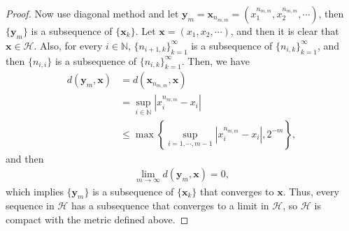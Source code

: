 \documentclass[11pt]{article}
\theoremstyle{definition}
\numberwithin{equation}{subsection}
\begin{document}
\begin{proof}
Now use diagonal method and let $\mathbf{y}_m = \mathbf{x}_{n_{m,m}} = \left(x^{n_{m,m}}_1, x^{n_{m,m}}_2, \cdots \right)$, then $\{\mathbf{y}_m\}$ is a subsequence of $\{\mathbf{x}_k\}$. Let $\mathbf{x} = (x_1, x_2,  \cdots)$, and then it is clear that $\mathbf{x} \in \mathcal{H}$. Also, for every $i \in \mathbb{N}$, $\{n_{i+1,k}\}^{\infty}_{k=1}$ is a subsequence of $\{n_{i,k}\}^{\infty}_{k=1}$, and then $\{n_{i,i}\}$ is a subsequence of $\{n_{i,k}\}^{\infty}_{k=1}$. Then, we have
\begin{align*}
    d(\mathbf{y}_m, \mathbf{x}) & = d\left(\mathbf{x}_{n_{m,m}}, \mathbf{x} \right) \\
    & = \sup_{i \in \mathbb{N}} \left|x^{n_{m,m}}_{i} - x_i \right| \\
    & \leq \max \left\{ \sup_{i = 1, \cdots, m-1} \left|x^{n_{m,m}}_{i} - x_i \right|, 2^{-m} \right\},
\end{align*}
and then 
\begin{align*}
    \lim_{m \to \infty} d(\mathbf{y}_m, \mathbf{x}) = 0,
\end{align*}
which implies $\{\mathbf{y}_m\}$ is a subsequence of $\{\mathbf{x}_k\}$ that converges to $\mathbf{x}$. Thus, every sequence in $\mathcal{H}$ has a subsequence that converges to a limit in $\mathcal{H}$, so $\mathcal{H}$ is compact with the metric defined above.
\end{proof}

\medskip
\end{document}
